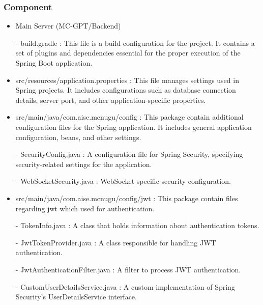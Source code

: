 \documentclass[conference]{IEEEtran}
\begin{document}
        \subsubsection{Component}
            \begin{itemize}
                \item Main Server (MC-GPT/Backend)
                    \item[-]build.gradle : This file is a build configuration for the project. It contains a set of plugins and dependencies essential for the proper execution of the Spring Boot application.
                \vspace{3mm}
                
                \item src/resources/application.properties : This file manages settings used in Spring projects. It includes configurations such as database connection details, server port, and other application-specific properties.
                \vspace{3mm}
                
                \item src/main/java/com.aise.mcnugu/config : This package contain additional configuration files for the Spring application. It includes general application configuration, beans, and other settings.
                    \item[-] SecurityConfig.java : A configuration file for Spring Security, specifying security-related settings for the application.
                    \item[-] WebSocketSecurity.java : WebSocket-specific security configuration.
                \vspace{3mm}
                
                \item src/main/java/com.aise.mcnugu/config/jwt : This package contain files regarding jwt which used for authentication.
                    \item[-] TokenInfo.java : A class that holds information about authentication tokens.
                    \item[-] JwtTokenProvider.java : A class responsible for handling JWT authentication.
                    \item[-] JwtAuthenticationFilter.java : A filter to process JWT authentication.
                    \item[-] CustomUserDetailsService.java : A custom implementation of Spring Security’s UserDetailsService interface.
                \vspace{3mm}
                

\end{itemize}
\end{document}
